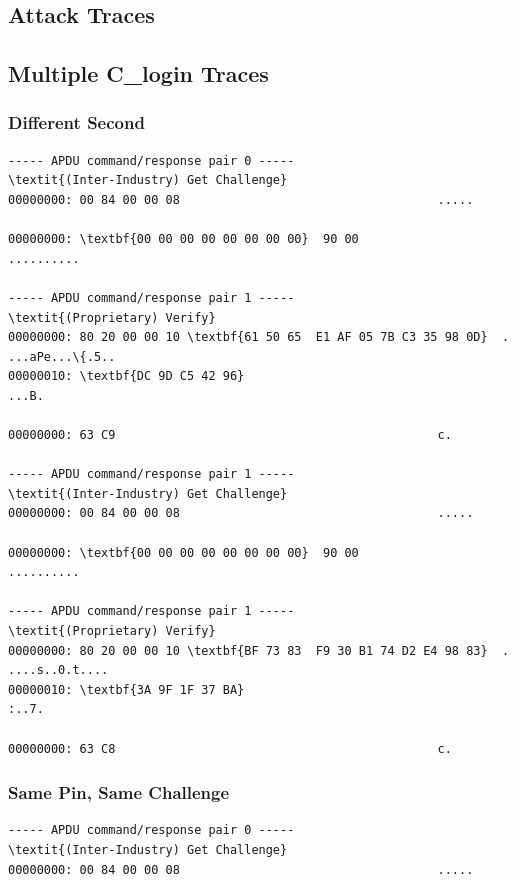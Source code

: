 \documentclass[bsc,frontabs,twoside,singlespacing,parskip,deptreport]{infthesis}     %
\begin{document}
\begin{appendices}

\chapter{Attack Traces}

\section{Multiple C\_login Traces}
\subsection{Different Second}
\begin{Verbatim}[commandchars=\\\{\}, fontsize=\small]
----- APDU command/response pair 0 -----
\textit{(Inter-Industry) Get Challenge}
00000000: 00 84 00 00 08                                    .....

00000000: \textbf{00 00 00 00 00 00 00 00}  90 00                    ..........

----- APDU command/response pair 1 -----
\textit{(Proprietary) Verify}
00000000: 80 20 00 00 10 \textbf{61 50 65  E1 AF 05 7B C3 35 98 0D}  . ...aPe...\{.5..
00000010: \textbf{DC 9D C5 42 96}                                    ...B.

00000000: 63 C9                                             c.

----- APDU command/response pair 1 -----
\textit{(Inter-Industry) Get Challenge}
00000000: 00 84 00 00 08                                    .....

00000000: \textbf{00 00 00 00 00 00 00 00}  90 00                    ..........

----- APDU command/response pair 1 -----
\textit{(Proprietary) Verify}
00000000: 80 20 00 00 10 \textbf{BF 73 83  F9 30 B1 74 D2 E4 98 83}  . ....s..0.t....
00000010: \textbf{3A 9F 1F 37 BA}                                    :..7.

00000000: 63 C8                                             c.
\end{Verbatim}
\subsection{Same Pin, Same Challenge}
\begin{Verbatim}[commandchars=\\\{\}, fontsize=\small]
----- APDU command/response pair 0 -----
\textit{(Inter-Industry) Get Challenge}
00000000: 00 84 00 00 08                                    .....


\end{Verbatim}
\end{appendices}
\end{document}
